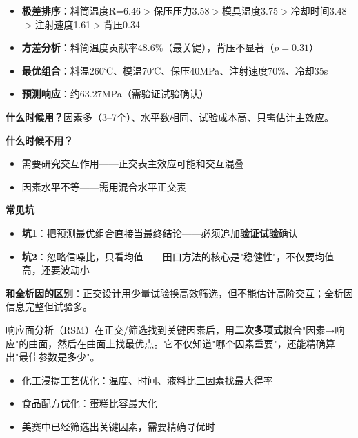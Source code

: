 \begin{algoresult}
\begin{itemize}
    \item \textbf{极差排序}：料筒温度R=6.46$>$保压压力3.58$>$模具温度3.75$>$冷却时间3.48$>$注射速度1.61$>$背压0.34
    \item \textbf{方差分析}：料筒温度贡献率48.6\%（最关键），背压不显著（$p=0.31$）
    \item \textbf{最优组合}：料温260℃、模温70℃、保压40MPa、注射速度70\%、冷却35s
    \item \textbf{预测响应}：约63.27MPa（需验证试验确认）
\end{itemize}
\end{algoresult}

\begin{algonotes}
\textbf{什么时候用？}因素多（3--7个）、水平数相同、试验成本高、只需估计主效应。

\textbf{什么时候不用？}
\begin{itemize}
    \item 需要研究交互作用——正交表主效应可能和交互混叠
    \item 因素水平不等——需用混合水平正交表
\end{itemize}

\textbf{常见坑}
\begin{itemize}
    \item \textbf{坑1}：把预测最优组合直接当最终结论——必须追加\textbf{验证试验}确认
    \item \textbf{坑2}：忽略信噪比，只看均值——田口方法的核心是"稳健性"，不仅要均值高，还要波动小
\end{itemize}

\textbf{和全析因的区别}：正交设计用少量试验换高效筛选，但不能估计高阶交互；全析因信息完整但试验多。
\end{algonotes}


\begin{algointro}
响应面分析（RSM）在正交/筛选找到关键因素后，用\textbf{二次多项式}拟合"因素→响应"的曲面，然后在曲面上找最优点。它不仅知道"哪个因素重要"，还能精确算出"最佳参数是多少"。
\end{algointro}

\begin{algoscene}
\begin{itemize}
    \item 化工浸提工艺优化：温度、时间、液料比三因素找最大得率
    \item 食品配方优化：蛋糕比容最大化
    \item 美赛中已经筛选出关键因素，需要精确寻优时
\end{itemize}
\end{algoscene}

